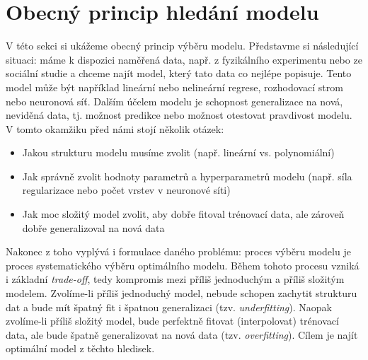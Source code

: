 \section{Obecný princip hledání modelu}
\label{sec:obecny-princip}
V této sekci si ukážeme obecný princip výběru modelu.
Představme si následující situaci: máme k dispozici naměřená data, např. z fyzikálního experimentu nebo ze sociální studie a chceme najít model, který tato data co nejlépe popisuje.
Tento model může být například lineární nebo nelineární regrese, rozhodovací strom nebo neuronová síť.
Dalším účelem modelu je schopnost generalizace na nová, neviděná data, tj. možnost predikce nebo možnost otestovat pravdivost modelu.
V tomto okamžiku před námi stojí několik otázek: 
\begin{itemize}
  \item Jakou strukturu modelu musíme zvolit (např. lineární vs. polynomiální)
  \item Jak správně zvolit hodnoty parametrů a hyperparametrů modelu (např. síla regularizace nebo počet vrstev v neuronové síti)
  \item Jak moc složitý model zvolit, aby dobře fitoval trénovací data, ale zároveň dobře generalizoval na nová data
\end{itemize}
Nakonec z toho vyplývá i formulace daného problému: proces výběru modelu je proces systematického výběru optimálního modelu.
Během tohoto procesu vzniká i základní \emph{trade-off}, tedy kompromis mezi příliš jednoduchým a příliš složitým modelem. 
Zvolíme-li příliš jednoduchý model, nebude schopen zachytit strukturu dat a bude mít špatný fit i špatnou generalizaci (tzv. \emph{underfitting}).
Naopak zvolíme-li příliš složitý model, bude perfektně fitovat (interpolovat) trénovací data, ale bude špatně generalizovat na nová data (tzv. \emph{overfitting}).
Cílem je najít optimální model z těchto hledisek.
\par

